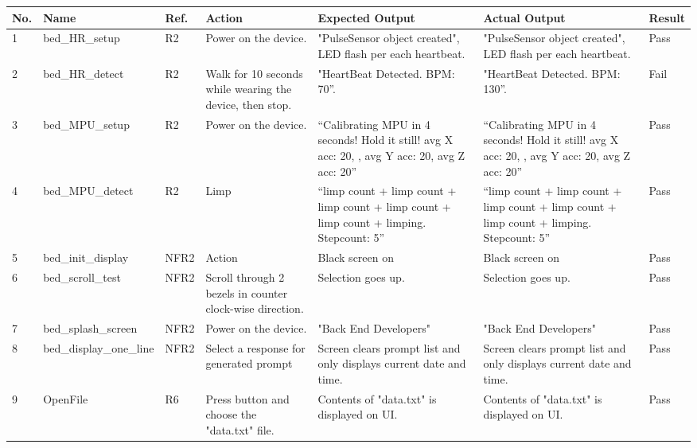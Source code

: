 \documentclass[12pt, titlepage]{article}
\begin{document}
\begin{center}
\begin{table} 
\begin{tabular}{ | p{0.5cm} | p{2.8cm} |  p{1.1cm} | p{2.7cm} | p{2.7cm} | p{2.7cm} | p{1.1cm} |}
\hline
\textbf{No.} & \textbf{Name}  & \textbf{Ref.} & \textbf{Action} & \textbf{Expected Output} & \textbf{Actual Output} & \textbf{Result} \\
\hline
 1 & bed\_HR\_setup & R2 & Power on the device. & "PulseSensor object created", LED flash per each heartbeat. & "PulseSensor object created", LED flash per each heartbeat. & Pass \\ 
\hline
2 & bed\_HR\_detect & R2 & Walk for 10 seconds while wearing the device, then stop. & "HeartBeat Detected. BPM: 70”. & "HeartBeat Detected. BPM: 130”. & Fail \\  
\hline
3 & bed\_MPU\newline \_setup & R2 & Power on the device. & “Calibrating MPU in 4 seconds! Hold it still! avg X acc: 20, , avg Y acc: 20, avg Z acc: 20” & “Calibrating MPU in 4 seconds! Hold it still! avg X acc: 20, , avg Y acc: 20, avg Z acc: 20” & Pass \\  
\hline
4 & bed\_MPU\newline \_detect & R2 & Limp & “limp count + limp count + limp count + limp count + limp count + limping. Stepcount: 5” & “limp count + limp count + limp count + limp count + limp count + limping. Stepcount: 5” & Pass \\ 
\hline
5 & bed\_init\_display & NFR2 & Action & Black screen on & Black screen on & Pass \\ 
\hline
6 & bed\_scroll\_test &  NFR2 & Scroll through 2 bezels in counter clock-wise direction. & Selection goes up. & Selection goes up. & Pass \\ 
\hline
7 & bed\_splash\newline \_screen & NFR2 & Power on the device. & "Back End Developers" & "Back End Developers" & Pass \\ 
\hline
8 & bed\_display\newline \_one\_line & NFR2 & Select a response for generated prompt & Screen clears prompt list and only displays current date and time. & Screen clears prompt list and only displays current date and time. & Pass \\ 
\hline
9 & OpenFile & R6 & Press button and choose the "data.txt" file. & Contents of "data.txt" is displayed on UI. & Contents of "data.txt" is displayed on UI.  & Pass \\ 
\hline
\end{tabular}
\end{table}
\end{center}
\end{document}
